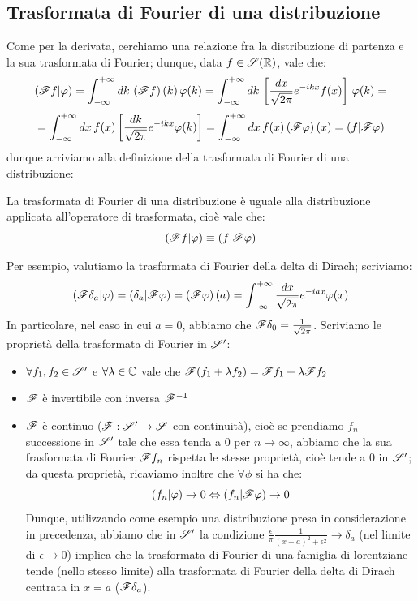 \subsection{Trasformata di Fourier di una distribuzione}
Come per la derivata, cerchiamo una relazione fra la distribuzione di partenza e la sua trasformata di Fourier; dunque, data $f \in \S(\R)$, vale che:
$$(\F f|\phi)=\int_{-\infty} ^{+\infty} dk \, \left( \F f \right) (k) \, \phi(k)=\int_{-\infty} ^{+\infty} dk \, \left[ \frac{dx}{\sqrt{2 \pi}} e^{-ikx} f(x) \right] \, \phi(k)=$$
$$=\int_{-\infty} ^{+\infty} dx \,f(x) \left[ \frac{dk}{\sqrt{2 \pi}} e^{-ikx} \phi(k) \right] = \int_{-\infty} ^{+\infty} dx \,f(x) \left( \F \phi \right) (x) =(f|\F \phi)$$
dunque arriviamo alla definizione della trasformata di Fourier di una distribuzione:
\begin{definizione}
La trasformata di Fourier di una distribuzione è uguale alla distribuzione applicata all'operatore di trasformata, cioè vale che:
$$(\F f|\phi) \equiv (f|\F \phi)$$
\end{definizione}
Per esempio, valutiamo la trasformata di Fourier della delta di Dirach; scriviamo:
$$(\F \delta_a|\phi)=(\delta_a|\F\phi)=\left( \F \phi \right) (a)= \int_{- \infty} ^{+\infty} \frac{dx}{\sqrt{2 \pi}} e^{-iax} \phi(x)$$
In particolare, nel caso in cui $a=0$, abbiamo che $\F \delta_0 = \frac{1}{\sqrt{2 \pi}}$.
\clearpage
Scriviamo le proprietà della trasformata di Fourier in $\S'$:
\begin{itemize}
\item $\forall f_1, f_2 \in \S'$ e $\forall \lambda \in \C$ vale che $\F(f_1 + \lambda f_2)=\F f_1 + \lambda \F f_2$
\item $\F$ è invertibile con inversa $\F^{-1}$
\item $\F$ è continuo ($\F:\S' \to \S$ con continuità), cioè se prendiamo $f_n$ successione in $\S'$ tale che essa tenda a 0 per $n \to \infty$, abbiamo che la sua frasformata di Fourier $\F f_n$ rispetta le stesse proprietà, cioè tende a 0 in $\S'$; da questa proprietà, ricaviamo inoltre che $\forall \phi$ si ha che:
$$(f_n|\phi) \to 0 \iff (f_n | \F \phi) \to 0$$
Dunque, utilizzando come esempio una distribuzione presa in considerazione in precedenza, abbiamo che in $\S'$ la condizione $\frac{\epsilon}{\pi} \frac{1}{(x-a)^2 + \epsilon^2} \to \delta_a$ (nel limite di $\epsilon \to 0$) implica che la trasformata di Fourier di una famiglia di lorentziane tende (nello stesso limite) alla trasformata di Fourier della delta di Dirach centrata in $x=a$ ($\F \delta_a$).
\end{itemize}

